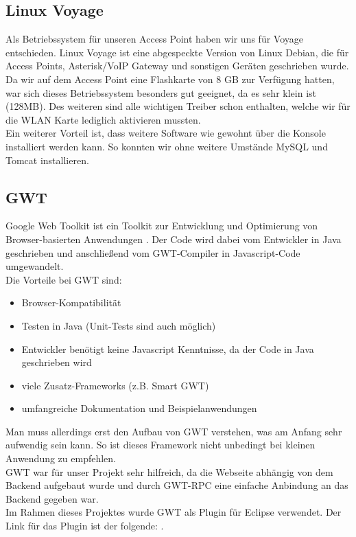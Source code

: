 \documentclass[12pt,a4paper,twoside]{article}
\begin{document}
\subsection{Linux Voyage \cite{voyage}} 
Als Betriebssystem für unseren Access Point haben wir uns für Voyage entschieden. Linux Voyage ist eine abgespeckte Version von Linux Debian, die für Access Points, Asterisk/VoIP Gateway und sonstigen Geräten geschrieben wurde. Da wir auf dem Access Point eine Flashkarte von 8 GB zur Verfügung hatten, war sich dieses Betriebssystem besonders gut geeignet, da es sehr  klein ist (128MB). Des weiteren sind alle wichtigen Treiber schon enthalten, welche wir für die WLAN Karte lediglich aktivieren mussten. \\
Ein weiterer Vorteil ist, dass weitere Software wie gewohnt über die Konsole installiert werden kann. So konnten wir ohne weitere Umstände MySQL und Tomcat installieren.

\subsection{GWT \cite{gwt}}
Google Web Toolkit ist ein Toolkit zur Entwicklung und Optimierung von Browser-basierten Anwendungen \cite{gwt}. Der Code wird dabei vom Entwickler in Java geschrieben und anschließend vom GWT-Compiler in Javascript-Code umgewandelt. \\
Die Vorteile bei GWT sind:
\begin{itemize}
 \item Browser-Kompatibilität
 \item Testen in Java (Unit-Tests sind auch möglich)
 \item Entwickler benötigt keine Javascript Kenntnisse, da der Code in Java geschrieben wird
 \item viele Zusatz-Frameworks (z.B. Smart GWT)
 \item umfangreiche Dokumentation und Beispielanwendungen
\end{itemize}

Man muss allerdings erst den Aufbau von GWT verstehen, was am Anfang sehr aufwendig sein kann. So ist dieses Framework nicht unbedingt bei kleinen Anwendung zu empfehlen. \\
GWT war für unser Projekt sehr hilfreich, da die Webseite abhängig von dem Backend aufgebaut wurde und durch GWT-RPC eine einfache Anbindung an das Backend gegeben war.\\
\newline
Im Rahmen dieses Projektes wurde GWT als Plugin für Eclipse verwendet. Der Link für das Plugin ist der folgende: \cite{gwtplugin}.
\end{document}

